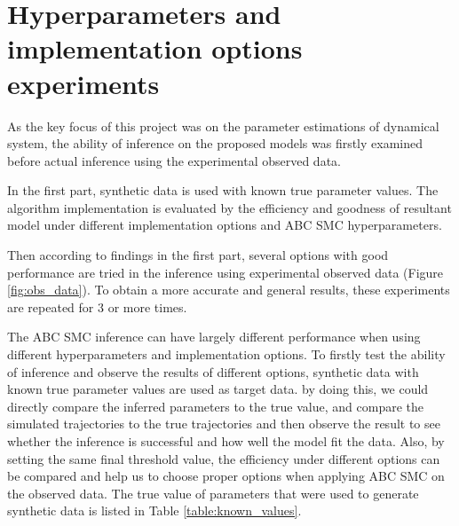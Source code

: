 




\section{Hyperparameters and implementation options experiments}

As the key focus of this project was on the parameter estimations of dynamical system, the ability of inference on the proposed models was firstly examined before actual inference using the experimental observed data.

In the first part, synthetic data is used with known true parameter values. The algorithm implementation is evaluated by the efficiency and goodness of resultant model under different implementation options and ABC SMC hyperparameters.

Then according to findings in the first part, several options with good performance are tried in the inference using experimental observed data (Figure \ref{fig:obs_data}). To obtain a more accurate and general results, these experiments are repeated for 3 or more times.





The ABC SMC inference can have largely different performance when using different hyperparameters and implementation options. To firstly test the ability of inference and observe the results of different options, synthetic data with known true parameter values are used as target data. by doing this, we could directly compare the inferred parameters to the true value, and compare the simulated trajectories to the true trajectories and then observe the result to see whether the inference is successful and how well the model fit the data. Also, by setting the same final threshold value, the efficiency under different options can be compared and help us to choose proper options when applying ABC SMC on the observed data. The true value of parameters that were used to generate synthetic data is listed in Table \ref{table:known_values}. 

